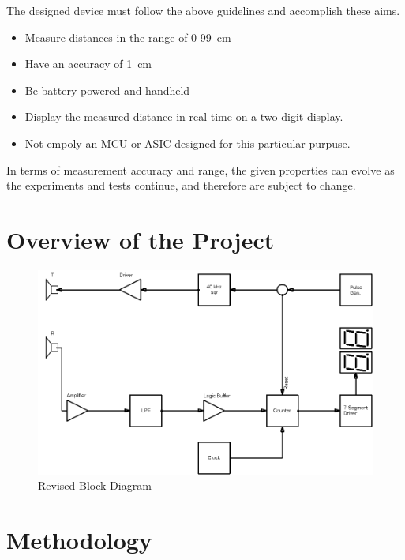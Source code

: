 \documentclass[12pt, a4paper]{article}
\begin{document}
        \noindent The designed device must follow the above guidelines and accomplish these aims. 
        \begin{itemize}
            \item Measure distances in the range of 0-99\SI{}{\centi\metre}
            \item Have an accuracy of \SI{1}{\centi\metre}
            \item Be battery powered and handheld
            \item Display the measured distance in real time on a two digit display.
            \item Not empoly an MCU or ASIC designed for this particular purpuse.
        \end{itemize}

        \noindent In terms of measurement accuracy and range, the given properties can evolve as the experiments and tests continue, and therefore are subject to change. 

        
    \pagebreak
    \section{Overview of the Project}

        \begin{figure}[H]\centering
            \includegraphics[width = \textwidth]{schematics/blockdiagram_v3.png}
            \caption[]{Revised Block Diagram}
        \end{figure}

       \pagebreak
        
    \section{Methodology}
    
\end{document}
